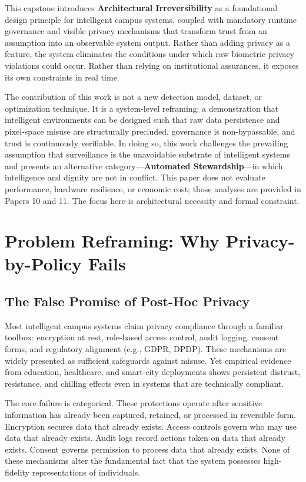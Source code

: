 \documentclass[conference]{IEEEtran}
\begin{document}
This capstone introduces \textbf{Architectural Irreversibility} as a foundational design principle for intelligent campus systems, coupled with mandatory runtime governance and visible privacy mechanisms that transform trust from an assumption into an observable system output. Rather than adding privacy as a feature, the system eliminates the conditions under which raw biometric privacy violations could occur. Rather than relying on institutional assurances, it exposes its own constraints in real time.

The contribution of this work is not a new detection model, dataset, or optimization technique. It is a system-level reframing: a demonstration that intelligent environments can be designed such that raw data persistence and pixel-space misuse are structurally precluded, governance is non-bypassable, and trust is continuously verifiable. In doing so, this work challenges the prevailing assumption that surveillance is the unavoidable substrate of intelligent systems and presents an alternative category---\textbf{Automated Stewardship}---in which intelligence and dignity are not in conflict. This paper does not evaluate performance, hardware resilience, or economic cost; those analyses are provided in Papers 10 and 11. The focus here is architectural necessity and formal constraint.

\section{Problem Reframing: Why Privacy-by-Policy Fails}

\subsection{The False Promise of Post-Hoc Privacy}
Most intelligent campus systems claim privacy compliance through a familiar toolbox: encryption at rest, role-based access control, audit logging, consent forms, and regulatory alignment (e.g., GDPR, DPDP). These mechanisms are widely presented as sufficient safeguards against misuse. Yet empirical evidence from education, healthcare, and smart-city deployments shows persistent distrust, resistance, and chilling effects even in systems that are technically compliant.

The core failure is categorical. These protections operate after sensitive information has already been captured, retained, or processed in reversible form. Encryption secures data that already exists. Access controls govern who may use data that already exists. Audit logs record actions taken on data that already exists. Consent governs permission to process data that already exists. None of these mechanisms alter the fundamental fact that the system possesses high-fidelity representations of individuals.
\end{document}
